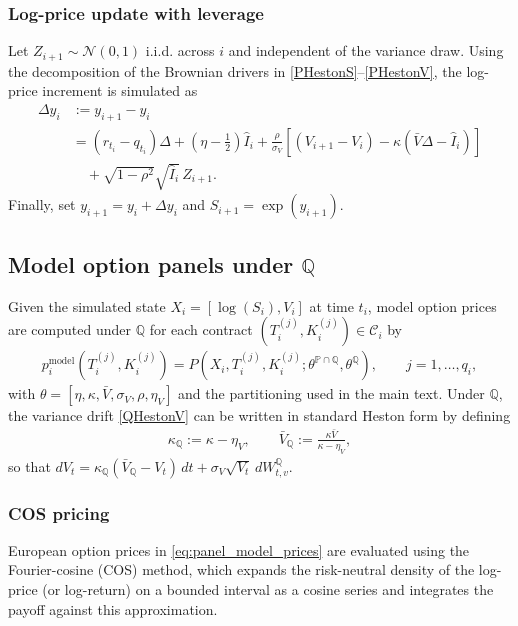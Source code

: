 \documentclass[11pt,a4paper,notitlepage]{article}
\numberwithin{equation}{section}
\begin{document}
\subsubsection{Log-price update with leverage}
Let $Z_{i+1}\sim\mathcal{N}(0,1)$ i.i.d. across $i$ and independent of the variance draw.
Using the decomposition of the Brownian drivers in \eqref{PHestonS}--\eqref{PHestonV},
the log-price increment is simulated as
\begin{align}
\Delta y_i
&:= y_{i+1}-y_i \nonumber\\
&= (r_{t_i}-q_{t_i})\Delta
+ \left(\eta-\frac{1}{2}\right)\widehat{I}_i
+ \frac{\rho}{\sigma_V}\left[\left(V_{i+1}-V_i\right)-\kappa\left(\bar{V}\Delta-\widehat{I}_i\right)\right] \nonumber\\
&\quad + \sqrt{1-\rho^2}\sqrt{\widehat{I}_i}\,Z_{i+1}.
\label{eq:logS_update}
\end{align}
Finally, set $y_{i+1}=y_i+\Delta y_i$ and $S_{i+1}=\exp(y_{i+1})$.

\subsection{Model option panels under $\mathbb{Q}$}
Given the simulated state $X_i=[\log(S_i),V_i]$ at time $t_i$, model option prices are computed under
$\mathbb{Q}$ for each contract $(T_i^{(j)},K_i^{(j)})\in\mathcal{C}_i$ by
\begin{align}
p_{i}^{\mathrm{model}}(T_i^{(j)},K_i^{(j)})
= P\!\left(X_i,T_i^{(j)},K_i^{(j)};\theta^{\mathbb{P}\cap\mathbb{Q}},\theta^{\mathbb{Q}}\right),
\qquad j=1,\dots,q_i,
\label{eq:panel_model_prices}
\end{align}
with $\theta=[\eta,\kappa,\bar V,\sigma_V,\rho,\eta_V]$ and the partitioning used in the main text.
Under $\mathbb{Q}$, the variance drift \eqref{QHestonV} can be written in standard Heston form by defining
\begin{align}
\kappa_{\mathbb{Q}} := \kappa-\eta_V,
\qquad
\bar V_{\mathbb{Q}} := \frac{\kappa\bar V}{\kappa-\eta_V},
\end{align}
so that $dV_t=\kappa_{\mathbb{Q}}(\bar V_{\mathbb{Q}}-V_t)\,dt+\sigma_V\sqrt{V_t}\,dW^{\mathbb{Q}}_{t,v}$.

\subsubsection{COS pricing}
European option prices in \eqref{eq:panel_model_prices} are evaluated using the Fourier-cosine (COS)
method, which expands the risk-neutral density of the log-price (or log-return) on a bounded interval
as a cosine series and integrates the payoff against this approximation.
\end{document}

